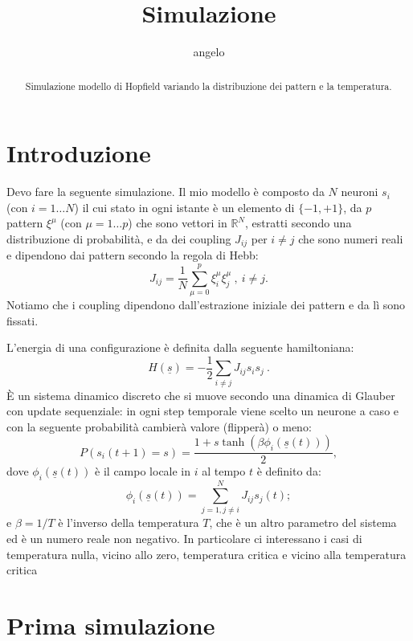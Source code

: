 \documentclass[a4paper,10pt]{article}
\title{Simulazione}
\author{angelo}
\begin{document}
\maketitle

\begin{abstract}
Simulazione modello di Hopfield variando la distribuzione dei pattern e la temperatura.
\end{abstract}

\section*{Introduzione}

Devo fare la seguente simulazione. Il mio modello è composto da $N$ neuroni $s_i$ (con $i=1\ldots N$) il cui stato in ogni istante è un elemento di $\{-1,+1 \}$, da $p$ pattern $\xi^\mu$ (con $\mu=1\ldots p$) che sono vettori in $\mathbb{R}^N$, estratti secondo una distribuzione di probabilità, e da dei coupling $J_{ij}$ per $i\neq j$ che sono numeri reali e dipendono dai pattern secondo la regola di Hebb:
\begin{equation}
 J_{ij}=\frac{1}{N}\sum_{\mu = 0}^p \xi_i^\mu \xi_j^\mu \ ,\ i\neq j .
 \label{eq:hebb}
\end{equation}
Notiamo che i coupling dipendono dall'estrazione iniziale dei pattern e da lì sono fissati.

L'energia di una configurazione è definita dalla seguente hamiltoniana:
\begin{equation}
 H(\underline{s}) = -\frac{1}{2} \sum_{i\neq j} J_{ij} s_i s_j\ .
 \label{eq:ham}
\end{equation}
\`{E} un sistema dinamico discreto che si muove secondo una dinamica di Glauber \cite{10.1063/1.1703954} con update sequenziale: in ogni step temporale viene scelto un neurone a caso e con la seguente probabilità cambierà valore (flipperà) o meno:
\[
 P(s_i(t+1)=s) = \frac{1 + s \tanh (\beta \phi_i(\underline{s}(t)))}{2} ,
\]
dove $\phi_i(\underline{s}(t))$ è il campo locale in $i$ al tempo $t$ è definito da:
\[
 \phi_i(\underline{s}(t)) = \sum_{j=1,j\neq i}^N J_{ij}s_j(t) ;
\]
e  $\beta = 1/T$ è l'inverso della temperatura $T$, che è un altro parametro del sistema ed è un numero reale non negativo. In particolare ci interessano i casi di temperatura nulla, vicino allo zero, temperatura critica e vicino alla temperatura critica

\section{Prima simulazione}
\end{document}
